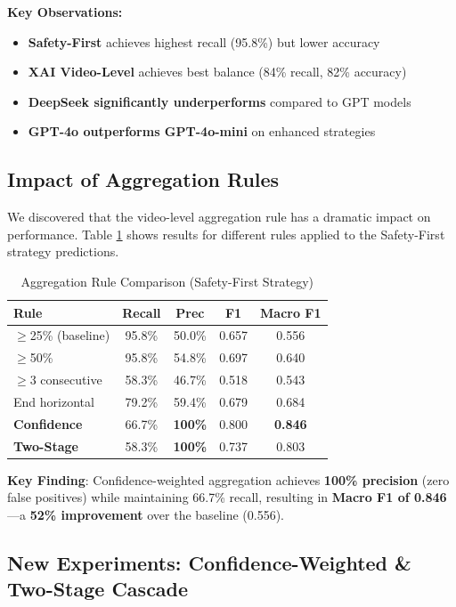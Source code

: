\documentclass[conference]{IEEEtran}
\begin{document}
\textbf{Key Observations:}
\begin{itemize}[leftmargin=*]
    \item \textbf{Safety-First} achieves highest recall (95.8\%) but lower accuracy
    \item \textbf{XAI Video-Level} achieves best balance (84\% recall, 82\% accuracy)
    \item \textbf{DeepSeek significantly underperforms} compared to GPT models
    \item \textbf{GPT-4o outperforms GPT-4o-mini} on enhanced strategies
\end{itemize}

\subsection{Impact of Aggregation Rules}

We discovered that the video-level aggregation rule has a dramatic impact on performance. Table \ref{tab:aggregation} shows results for different rules applied to the Safety-First strategy predictions.

\begin{table}[H]
\centering
\caption{Aggregation Rule Comparison (Safety-First Strategy)}
\label{tab:aggregation}
\begin{tabular}{lcccc}
\toprule
\textbf{Rule} & \textbf{Recall} & \textbf{Prec} & \textbf{F1} & \textbf{Macro F1} \\
\midrule
$\geq$25\% (baseline) & 95.8\% & 50.0\% & 0.657 & 0.556 \\
$\geq$50\% & 95.8\% & 54.8\% & 0.697 & 0.640 \\
$\geq$3 consecutive & 58.3\% & 46.7\% & 0.518 & 0.543 \\
End horizontal & 79.2\% & 59.4\% & 0.679 & 0.684 \\
\textbf{Confidence} & 66.7\% & \textbf{100\%} & 0.800 & \textbf{0.846} \\
\textbf{Two-Stage} & 58.3\% & \textbf{100\%} & 0.737 & 0.803 \\
\bottomrule
\end{tabular}
\end{table}

\textbf{Key Finding}: Confidence-weighted aggregation achieves \textbf{100\% precision} (zero false positives) while maintaining 66.7\% recall, resulting in \textbf{Macro F1 of 0.846}—a \textbf{52\% improvement} over the baseline (0.556).

\subsection{New Experiments: Confidence-Weighted \& Two-Stage Cascade}
\end{document}
